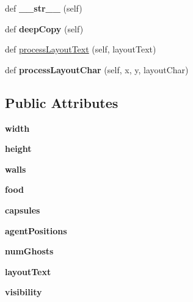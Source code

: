 \begin{DoxyCompactItemize}
def {\bfseries \+\_\+\+\_\+str\+\_\+\+\_\+} (self)
\item 
\mbox{\label{classlayout_1_1_layout_aebbd593a1d9ac45c3c3e1a82926de076}} 
def {\bfseries deep\+Copy} (self)
\item 
def \hyperlink{classlayout_1_1_layout_a4e7437180be84096a4352067707318eb}{process\+Layout\+Text} (self, layout\+Text)
\item 
\mbox{\label{classlayout_1_1_layout_a3f337d339f7a34f1f7149b43091c9607}} 
def {\bfseries process\+Layout\+Char} (self, x, y, layout\+Char)
\end{DoxyCompactItemize}
\subsection*{Public Attributes}
\begin{DoxyCompactItemize}
\item 
\mbox{\label{classlayout_1_1_layout_ae1f581ae0a8470e37f0073a010a13880}} 
{\bfseries width}
\item 
\mbox{\label{classlayout_1_1_layout_a1240dd71a3c0fbd34c7298d91a840df1}} 
{\bfseries height}
\item 
\mbox{\label{classlayout_1_1_layout_acfe8131363e76df140f8da2a1c4b8a7a}} 
{\bfseries walls}
\item 
\mbox{\label{classlayout_1_1_layout_accd46c3abae6c892d74d79e919b31f81}} 
{\bfseries food}
\item 
\mbox{\label{classlayout_1_1_layout_af0c5f58aa7c5a7b66fdb4926a8ac441f}} 
{\bfseries capsules}
\item 
\mbox{\label{classlayout_1_1_layout_ab2246a2777b806f8f4344fb25063cfe7}} 
{\bfseries agent\+Positions}
\item 
\mbox{\label{classlayout_1_1_layout_a5ab246ebcd9541a880d87523f57dee5c}} 
{\bfseries num\+Ghosts}
\item 
\mbox{\label{classlayout_1_1_layout_a1ccbddeb86f90301f41e3cd8b6c58661}} 
{\bfseries layout\+Text}
\item 
\mbox{\label{classlayout_1_1_layout_a2cfd77f7fa177e9c96992cad586aa879}} 
{\bfseries visibility}
\end{DoxyCompactItemize}


